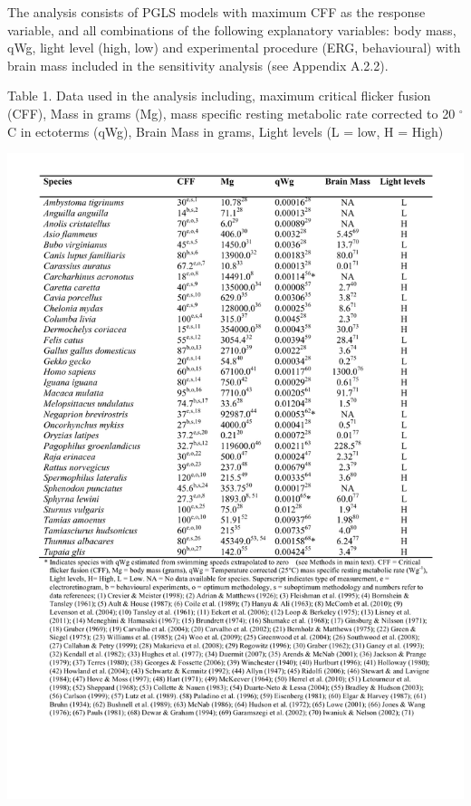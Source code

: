 The analysis consists of PGLS models with maximum CFF as the response variable, and all combinations of the following explanatory variables: body mass, qWg, light level (high, low) and experimental procedure (ERG, behavioural) with brain mass included in the sensitivity analysis (see Appendix A.2.2).

\newpage

\begin{table}[H]
  \caption*{Table 1. Data used in the analysis including, maximum critical flicker fusion (CFF), Mass in grams (Mg), mass specific resting metabolic rate corrected to 20 $^{\circ}$C in ectoterms (qWg), Brain Mass in grams, Light levels (L = low, H = High)}
  \label{tbl:Table 1.}
  \includegraphics[width=1.0\linewidth]{ch2-time/Table_1}
\end{table}

